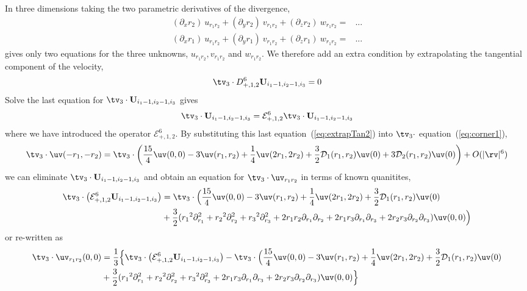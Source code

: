 \documentclass[12pt]{article}
\begin{document}
In three dimensions taking the two parametric derivatives of the divergence, 
\begin{align}
    (\partial_x r_2) ~ u_{r_1 r_2} + (\partial_y r_2) ~v_{r_1 r_2} + (\partial_z r_2) ~w_{r_1 r_2} =& 
                     ...  \label{eq:div3a}\\
    (\partial_x r_1) ~u_{r_1 r_2}  + (\partial_y r_1) ~v_{r_1 r_2} + (\partial_z r_1) ~w_{r_1 r_2} =&
                     ...  \label{eq:div3b}
\end{align}
gives only two equations for the three unknowns, $u_{r_1 r_2},v_{r_1 r_2}$ and $w_{r_1 r_2}$.
We therefore add an extra condition by extrapolating the tangential component of the velocity,
\begin{equation}
\tv_3 \cdot D_{+,1,2}^6  \uvd_{i_1-1,i_2-1,i_3} = 0  \label{eq:extrapTan}
\end{equation}
Solve the last equation for $\tv_3\cdot \uvd_{i_1-1,i_2-1,i_3}$ gives
\begin{equation}
\tv_3\cdot \uvd_{i_1-1,i_2-1,i_3} = {\mathcal E}_{+,1,2}^6 \tv_3\cdot\uvd_{i_1-1,i_2-1,i_3}  \label{eq:extrapTan2}
\end{equation}
where we have introduced the operator ${\mathcal E}_{+,1,2}^6$.
By substituting this last equation~(\ref{eq:extrapTan2}) into $\tv_3\cdot$ equation~(\ref{eq:corner1}),
\[
 \tv_3\cdot \uv(-\ra,-\rb) =\tv_3\cdot\left( {15\over4} \uv(0,0) - 3 \uv(\ra,\rb) + {1\over 4}\uv(2\ra,2\rb) 
                 + {3\over2}\Ds_1(\ra,\rb)\uv(0)
                 + 3\Ds_2(\ra,\rb)\uv(0) \right) +  \trunc 
\]
we can eliminate $\tv_3 \cdot\uvd_{i_1-1,i_2-1,i_3}$ and obtain an equation for 
$\tv_3 \cdot \uv_{r_1 r_2}$ in terms of known quanitites,
\begin{align*}
\tv_3 \cdot \left( {\mathcal E}_{+,1,2}^6 \uvd_{i_1-1,i_2-1,i_3} \right) 
  &= \tv_3\cdot\Big( {15\over4} \uv(0,0) - 3 \uv(\ra,\rb) + {1\over 4}\uv(2\ra,2\rb) + {3\over2}\Ds_1(\ra,\rb)\uv(0) \\
  & + {3\over2}( \ra^2\partial_\ra^2+\rb^2\partial_\rb^2 +\rc^2\partial_\rc^2
  + 2\ra\rb\partial_\ra\partial_\rb + 2\ra\rc\partial_\ra\partial_\rc + 2\rb\rc\partial_\rb\partial_\rc  )\uv(0,0)
                \Big)
\end{align*}
or re-written as
\begin{align}
  \tv_3\cdot \uv_{r_1 r_2}(0,0) &= {1\over 3}\Big\{
               \tv_3 \cdot \left( {\mathcal E}_{+,1,2}^6 \uvd_{i_1-1,i_2-1,i_3} \right) 
        -  \tv_3\cdot\Big( {15\over4} \uv(0,0) - 3 \uv(\ra,\rb) + {1\over 4}\uv(2\ra,2\rb)
             + {3\over2}\Ds_1(\ra,\rb)\uv(0)  \label{eq:div3c} \\
  & + {3\over2}( \ra^2\partial_\ra^2+\rb^2\partial_\rb^2 +\rc^2\partial_\rc^2
  + 2\ra\rc\partial_\ra\partial_\rc + 2\rb\rc\partial_\rb\partial_\rc
    )\uv(0,0)     \Big\}\nonumber
\end{align}
\end{document}
